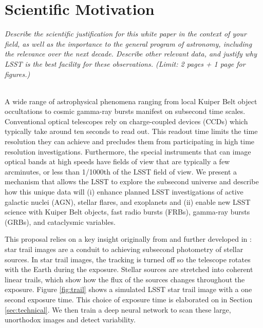 \documentclass[12pt, letterpaper]{article}
\begin{document}
\clearpage

\section{Scientific Motivation}

\begin{footnotesize}
{\it Describe the scientific justification for this white paper in the context
of your field, as well as the importance to the general program of astronomy, 
including the relevance over the next decade. 
Describe other relevant data, and justify why LSST is the best facility for these observations.
(Limit: 2 pages + 1 page for figures.)}
\end{footnotesize}
\\

A wide range of astrophysical phenomena ranging from local Kuiper Belt object occultations to cosmic gamma-ray bursts manifest on subsecond time scales. Conventional optical telescopes rely on charge-coupled devices (CCDs) which typically take around ten seconds to read out. This readout time limits the time resolution they can achieve and precludes them from participating in high time resolution investigations. Furthermore, the special instruments that can image optical bands at high speeds have fields of view that are typically a few arcminutes, or less than 1/1000th of the LSST field of view. We present a mechanism that allows the LSST to explore the subsecond universe and describe how this unique data will (i) enhance planned LSST investigations of active galactic nuclei (AGN), stellar flares, and exoplanets and (ii) enable new LSST science with Kuiper Belt objects, fast radio bursts (FRBs), gamma-ray bursts (GRBs), and cataclysmic variables.

This proposal relies on a key insight originally from \cite{1986PASP...98..802H} and further developed in \cite{mine}: star trail images are a conduit to achieving subsecond photometry of stellar sources. In star trail images, the tracking is turned off so the telescope rotates with the Earth during the exposure. Stellar sources are stretched into coherent linear trails, which show how the flux of the sources changes throughout the exposure. Figure \ref{fig:trail} shows a simulated LSST star trail image with a one second exposure time. This choice of exposure time is elaborated on in Section \ref{sec:technical}. We then train a deep neural network to scan these large, unorthodox images and detect variability.
\end{document}
